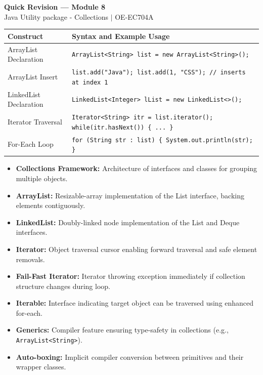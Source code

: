 \documentclass[12pt,a4paper]{article}
\renewcommand{\arraystretch}{1.45}
\begin{document}
\newpage
\begin{center}
  {\large\bfseries\color{myred} Quick Revision --- Module 8}\\[3pt]
  {\small\color{mydark} Java Utility package - Collections $|$ OE-EC704A}
\end{center}
\noindent{\color{myred}\rule{\linewidth}{1.2pt}}
\vspace{4pt}

\begin{tcolorbox}[formulabox, title={\textbf{Collection Syntax}}]
{\renewcommand{\arraystretch}{1.3}%
\begin{tabularx}{\linewidth}{l Y}
\textbf{Construct} & \textbf{Syntax and Example Usage} \\
\hline
ArrayList Declaration & \texttt{ArrayList<String> list = new ArrayList<String>();} \\
ArrayList Insert & \texttt{list.add("Java"); list.add(1, "CSS"); // inserts at index 1} \\
LinkedList Declaration & \texttt{LinkedList<Integer> lList = new LinkedList<>();} \\
Iterator Traversal & \texttt{Iterator<String> itr = list.iterator(); while(itr.hasNext()) \{ ... \}} \\
For-Each Loop & \texttt{for (String str : list) \{ System.out.println(str); \}} \\
\end{tabularx}}
\end{tcolorbox}

\begin{tcolorbox}[defbox, title={\textbf{One-Line Definitions}}]
\begin{itemize}[leftmargin=*, itemsep=2pt]
  \item \textbf{Collections Framework:} Architecture of interfaces and classes for grouping multiple objects.
  \item \textbf{ArrayList:} Resizable-array implementation of the List interface, backing elements contiguously.
  \item \textbf{LinkedList:} Doubly-linked node implementation of the List and Deque interfaces.
  \item \textbf{Iterator:} Object traversal cursor enabling forward traversal and safe element removals.
  \item \textbf{Fail-Fast Iterator:} Iterator throwing exception immediately if collection structure changes during loop.
  \item \textbf{Iterable:} Interface indicating target object can be traversed using enhanced for-each.
  \item \textbf{Generics:} Compiler feature ensuring type-safety in collections (e.g., \texttt{ArrayList<String>}).
  \item \textbf{Auto-boxing:} Implicit compiler conversion between primitives and their wrapper classes.
\end{itemize}
\end{tcolorbox}
\end{document}
